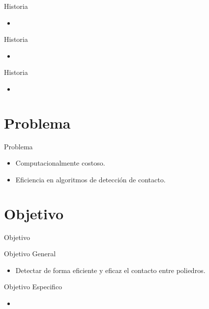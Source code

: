\documentclass[11pt]{beamer}
\begin{document}
\begin{frame}{Historia}
 \begin{itemize}
  \item %
 \end{itemize}
\end{frame}

\begin{frame}{Historia}
 \begin{itemize}
  \item %
 \end{itemize}
\end{frame}

\begin{frame}{Historia}
 \begin{itemize}
  \item %
 \end{itemize}
\end{frame}

\section{Problema}
\begin{frame}{Problema}
\begin{itemize}
    \item Computacionalmente costoso.
    \item Eficiencia en algoritmos de detección de contacto.
\end{itemize}
\end{frame}

\section{Objetivo}
\begin{frame}{Objetivo}
\begin{block}{Objetivo General}
 \begin{itemize}
    \item Detectar de forma eficiente y eficaz el contacto entre poliedros.
 \end{itemize}
\end{block}
\begin{block}{Objetivo Especifico}
 \begin{itemize}
  \item 
 \end{itemize}
\end{block}
\end{frame}     
\end{document}
